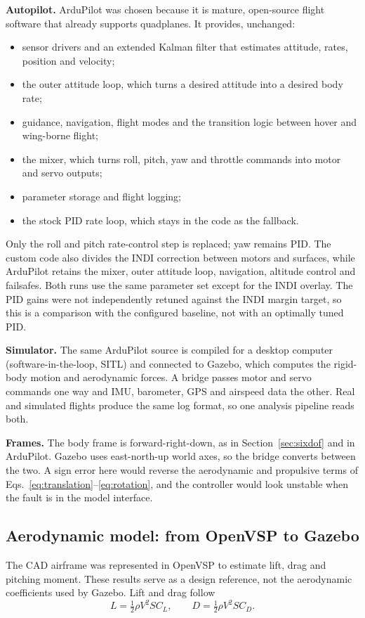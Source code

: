 \documentclass{article}
\begin{document}
\textbf{Autopilot.} ArduPilot was chosen because it is mature, open-source flight software that already supports quadplanes. It provides, unchanged:
\begin{itemize}
    \item sensor drivers and an extended Kalman filter that estimates attitude, rates, position and velocity;
    \item the outer attitude loop, which turns a desired attitude into a desired body rate;
    \item guidance, navigation, flight modes and the transition logic between hover and wing-borne flight;
    \item the mixer, which turns roll, pitch, yaw and throttle commands into motor and servo outputs;
    \item parameter storage and flight logging;
    \item the stock PID rate loop, which stays in the code as the fallback.
\end{itemize}
Only the roll and pitch rate-control step is replaced; yaw remains PID. The custom code also divides the INDI correction between motors and surfaces, while ArduPilot retains the mixer, outer attitude loop, navigation, altitude control and failsafes. Both runs use the same parameter set except for the INDI overlay. The PID gains were not independently retuned against the INDI margin target, so this is a comparison with the configured baseline, not with an optimally tuned PID.

\textbf{Simulator.} The same ArduPilot source is compiled for a desktop computer (software-in-the-loop, SITL) and connected to Gazebo, which computes the rigid-body motion and aerodynamic forces. A bridge passes motor and servo commands one way and IMU, barometer, GPS and airspeed data the other. Real and simulated flights produce the same log format, so one analysis pipeline reads both.

\textbf{Frames.} The body frame is forward-right-down, as in Section~\ref{sec:sixdof} and in ArduPilot. Gazebo uses east-north-up world axes, so the bridge converts between the two. A sign error here would reverse the aerodynamic and propulsive terms of Eqs.~\eqref{eq:translation}--\eqref{eq:rotation}, and the controller would look unstable when the fault is in the model interface.

\subsection{Aerodynamic model: from OpenVSP to Gazebo}
\label{sec:aero-model-method}
The CAD airframe was represented in OpenVSP \citep{openvspdocs} to estimate lift, drag and pitching moment. These results serve as a design reference, not the aerodynamic coefficients used by Gazebo. Lift and drag follow
\begin{equation}
    L=\tfrac{1}{2}\rho V^{2}SC_{L},\qquad D=\tfrac{1}{2}\rho V^{2}SC_{D}.
\end{equation}
\end{document}
